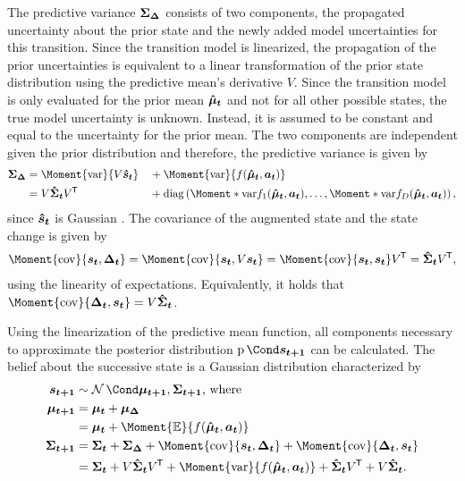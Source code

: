 The predictive variance $\bm{\Sigma_\Delta}$ consists of two components, the propagated uncertainty about the prior state and the newly added model uncertainties for this transition.
Since the transition model is linearized, the propagation of the prior uncertainties is equivalent to a linear transformation of the prior state distribution using the predictive mean's derivative $V$.
Since the transition model is only evaluated for the prior mean $\bm{\hat{\mu}_t}$ and not for all other possible states, the true model uncertainty is unknown.
Instead, it is assumed to be constant and equal to the uncertainty for the prior mean.
The two components are independent given the prior distribution and therefore, the predictive variance is given by
\begin{alignat}{2}
    \mat{\Sigma_\Delta} &= \Moment{\var}{V \rv{\hat{s}_t}} &&+ \Moment{\var}{f(\rv{\hat{\mu}_t}, \mat{a_t})} \\
    &= V \mat{\hat{\Sigma}_t} V\tran &&+ \diag\left(
        \Moment*{\var}{f_1(\rv{\hat{\mu}_t}, \mat{a_t})},
        \ldots,
        \Moment*{\var}{f_D(\rv{\hat{\mu}_t}, \mat{a_t})}
    \right),
\end{alignat}
since $\bm{\hat{s}_t}$ is Gaussian \cite{petersen_matrix_2008}.
The covariance of the augmented state and the state change is given by
\begin{align}
    \Moment{\cov}{\rv{s_t}, \rv{\Delta_t}} = \Moment{\cov}{\rv{s_t}, V\rv{s_t}} = \Moment{\cov}{\rv{s_t}, \rv{s_t}}V\tran = \mat{\hat{\Sigma}_t}V\tran,
\end{align}
using the linearity of expectations. Equivalently, it holds that $\Moment{\cov}{\rv{\Delta_t}, \rv{s_t}} = V \mat{\hat{\Sigma}_t}$.

Using the linearization of the predictive mean function, all components necessary to approximate the posterior distribution $\Prob{\rv{s_{t+1}}}$ can be calculated.
The belief about the successive state is a Gaussian distribution characterized by
\begin{align}
    \rv{s_{t+1}} &\sim \Gaussian{\mat{\mu_{t+1}}, \mat{\Sigma_{t+1}}} \text{, where} \\
    \mat{\mu_{t+1}} &= \mat{\mu_t} + \mat{\mu_\Delta} \\
    &= \mat{\mu_t} + \Moment{\E}{f(\rv{\hat{\mu}_t}, \mat{a_t})} \\
    \mat{\Sigma_{t+1}} &= \mat{\Sigma_t} + \mat{\Sigma_\Delta} + \Moment{\cov}{\rv{s_t}, \rv{\Delta_t}} + \Moment{\cov}{\rv{\Delta_t}, \rv{s_t}} \\
    &= \mat{\Sigma_t} + V\mat{\hat{\Sigma}_t}V\tran + \Moment{\var}{f(\rv{\hat{\mu}_t}, \mat{a_t})} + \mat{\hat{\Sigma}_t}V\tran + V\mat{\hat{\Sigma}_t}.
\end{align}

